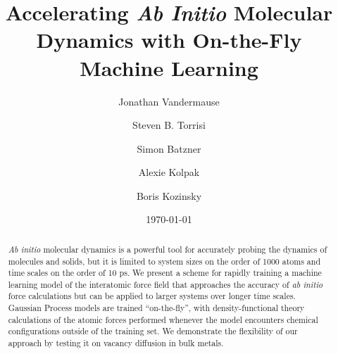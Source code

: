 \documentclass[%
superscriptaddress,
preprint,
amsmath,amssymb,
aps,
]{revtex4-1}
\begin{document}
\title{Accelerating \textit{Ab Initio} Molecular Dynamics with On-the-Fly
Machine Learning}

\author{Jonathan Vandermause}

\author{Steven B. Torrisi}

\author{Simon Batzner}

\author{Alexie Kolpak}

\author{Boris Kozinsky}





\date{\today}

\begin{abstract}
\textit{Ab initio} molecular dynamics is a powerful tool for
accurately probing the dynamics of molecules and solids, but it is limited
to system sizes on the order of 1000 atoms and time scales on the order of
10 ps. We present a scheme for rapidly training a machine learning 
model of the interatomic force field that approaches the accuracy of \textit{ab initio} force calculations but can be applied to larger systems over longer time scales. Gaussian Process models are trained “on-the-fly”, with density-functional theory calculations of the atomic forces performed whenever the model encounters chemical configurations outside of the training set. We demonstrate the flexibility of our approach by testing it on vacancy diffusion in bulk metals.
\end{abstract}
\end{document}
